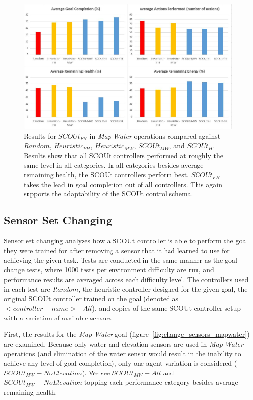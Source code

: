 \begin{figure}[H]
  \centering
  \includegraphics[width=1.0\columnwidth]{Figures/Results/Experiment2/GoalChange/MapWaterGoal.JPG}
  \caption[Experiment 2 - Goal Change Testing Results: $SCOUt_{FH}$]{Results for $SCOUt_{FH}$ in \textit{Map Water} operations compared against $Random$, $Heuristic_{FH}$, $Heuristic_{MW}$, $SCOUt_{MW}$, and $SCOUt_{H}$. Results show that all SCOUt controllers performed at roughly the same level in all categories. In all categories besides average remaining health, the SCOUt controllers perform best. $SCOUt_{FH}$ takes the lead in goal completion out of all controllers. This again supports the adaptability of the SCOUt control schema.}
  \label{fig:goal_change_mapwater}
\end{figure}


\subsection{Sensor Set Changing} \label{sec:sensor_change}
Sensor set changing analyzes how a SCOUt controller is able to perform the goal they were trained for after removing a sensor that it had learned to use for achieving the given task.
Tests are conducted in the same manner as the goal change tests, where 1000 tests per environment difficulty are run, and performance results are averaged across each difficulty level.
The controllers used in each test are $Random$, the heuristic controller designed for the given goal, the original SCOUt controller trained on the goal (denoted as $<controller-name> - All$), and copies of the same SCOUt controller setup with a variation of available sensors.

First, the results for the \textit{Map Water} goal (figure~\ref{fig:change_sensors_mapwater}) are examined.
Because only water and elevation sensors are used in \textit{Map Water} operations (and elimination of the water sensor would result in the inability to achieve any level of goal completion), only one agent variation is considered ($SCOUt_{MW} - No Elevation$).
We see $SCOUt_{MW} - All$ and $SCOUt_{MW} - No Elevation$ topping each performance category besides average remaining health.

